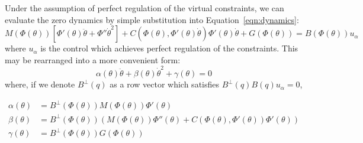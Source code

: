 Under the assumption of perfect regulation of the virtual constraints, we can evaluate the zero dynamics by simple substitution into Equation~\ref{eqn:dynamics}:
\begin{equation*}
	M\left(\Phi(\theta)\right)\left[\Phi'(\theta)\ddot{\theta} + \Phi''\dot{\theta}^2\right] + 
	C\left(\Phi(\theta),\Phi'(\theta)\dot{\theta}\right)\Phi'(\theta)\dot{\theta} +
	G\left(\Phi(\theta)\right) = B\left(\Phi(\theta)\right)u_\alpha
\end{equation*}%
where $u_\alpha$ is the control which achieves perfect regulation of the constraints. This may be rearranged into a more convenient form:
\begin{equation} \label{eqn:zerodyn}
	\alpha(\theta)\ddot{\theta} + \beta(\theta)\dot{\theta}^2 + \gamma(\theta) = 0
\end{equation}
where, if we denote $B^{\perp}(q)$ as a row vector which satisfies $B^{\perp}(q)B(q)u_\alpha = 0$,
\addtocounter{equation}{-1}
\begin{subequations}
\begin{align}
	\alpha(\theta) &= B^{\bot}\left(\Phi(\theta)\right)M\left(\Phi(\theta)\right)\Phi'(\theta) \\
	\beta(\theta) &= B^{\bot}\left(\Phi(\theta)\right)\left(M\left(\Phi(\theta)\right)\Phi''(\theta)
		+C\left(\Phi(\theta),\Phi'(\theta)\right)\Phi'(\theta) \right) \\
	\gamma(\theta) &= B^{\bot}\left(\Phi(\theta)\right)G\left(\Phi(\theta)\right)
\end{align}
\end{subequations}

